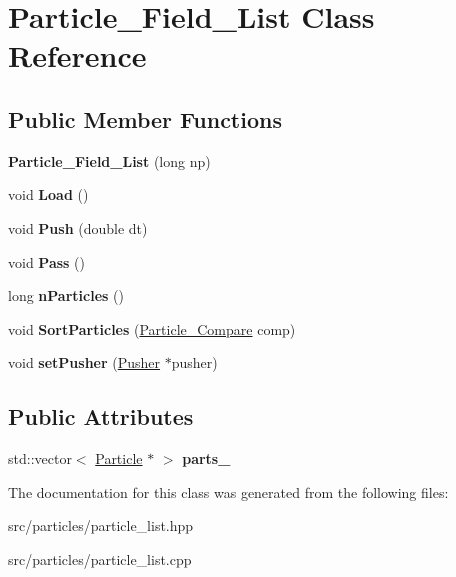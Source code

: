 \hypertarget{class_particle___field___list}{}\section{Particle\+\_\+\+Field\+\_\+\+List Class Reference}
\label{class_particle___field___list}
\subsection*{Public Member Functions}
\begin{DoxyCompactItemize}
\item 
\hypertarget{class_particle___field___list_adb8412593052a7c2d9d520f61a71925e}{}\label{class_particle___field___list_adb8412593052a7c2d9d520f61a71925e} 
{\bfseries Particle\+\_\+\+Field\+\_\+\+List} (long np)
\item 
\hypertarget{class_particle___field___list_ae36af53d8d7891eabba9dc35433a1fd9}{}\label{class_particle___field___list_ae36af53d8d7891eabba9dc35433a1fd9} 
void {\bfseries Load} ()
\item 
\hypertarget{class_particle___field___list_a3e3ae5d3305323ae815263bf8f8d92ad}{}\label{class_particle___field___list_a3e3ae5d3305323ae815263bf8f8d92ad} 
void {\bfseries Push} (double dt)
\item 
\hypertarget{class_particle___field___list_a147b292b835b8e39547858771e4c279a}{}\label{class_particle___field___list_a147b292b835b8e39547858771e4c279a} 
void {\bfseries Pass} ()
\item 
\hypertarget{class_particle___field___list_a0baa3beef71d9c0e026ba2f14b750529}{}\label{class_particle___field___list_a0baa3beef71d9c0e026ba2f14b750529} 
long {\bfseries n\+Particles} ()
\item 
\hypertarget{class_particle___field___list_a620fb6d347a8cc312d288550e63e3649}{}\label{class_particle___field___list_a620fb6d347a8cc312d288550e63e3649} 
void {\bfseries Sort\+Particles} (\hyperlink{class_particle___compare}{Particle\+\_\+\+Compare} comp)
\item 
\hypertarget{class_particle___field___list_aed3e3af8152eeb334ed57833aae9aa62}{}\label{class_particle___field___list_aed3e3af8152eeb334ed57833aae9aa62} 
void {\bfseries set\+Pusher} (\hyperlink{class_pusher}{Pusher} $\ast$pusher)
\end{DoxyCompactItemize}
\subsection*{Public Attributes}
\begin{DoxyCompactItemize}
\item 
\hypertarget{class_particle___field___list_af2d8e70da1a7e8bf8699b03550a2bc8e}{}\label{class_particle___field___list_af2d8e70da1a7e8bf8699b03550a2bc8e} 
std\+::vector$<$ \hyperlink{struct_particle}{Particle} $\ast$ $>$ {\bfseries parts\+\_\+}
\end{DoxyCompactItemize}


The documentation for this class was generated from the following files\+:\begin{DoxyCompactItemize}
\item 
src/particles/particle\+\_\+list.\+hpp\item 
src/particles/particle\+\_\+list.\+cpp\end{DoxyCompactItemize}
